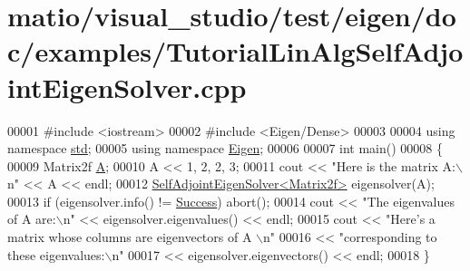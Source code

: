 \hypertarget{matio_2visual__studio_2test_2eigen_2doc_2examples_2_tutorial_lin_alg_self_adjoint_eigen_solver_8cpp_source}{}\section{matio/visual\+\_\+studio/test/eigen/doc/examples/\+Tutorial\+Lin\+Alg\+Self\+Adjoint\+Eigen\+Solver.cpp}
\label{matio_2visual__studio_2test_2eigen_2doc_2examples_2_tutorial_lin_alg_self_adjoint_eigen_solver_8cpp_source}

\begin{DoxyCode}
00001 \textcolor{preprocessor}{#include <iostream>}
00002 \textcolor{preprocessor}{#include <Eigen/Dense>}
00003 
00004 \textcolor{keyword}{using namespace }\hyperlink{namespacestd}{std};
00005 \textcolor{keyword}{using namespace }\hyperlink{namespace_eigen}{Eigen};
00006 
00007 \textcolor{keywordtype}{int} main()
00008 \{
00009    Matrix2f \hyperlink{group___core___module_class_eigen_1_1_matrix}{A};
00010    A << 1, 2, 2, 3;
00011    cout << \textcolor{stringliteral}{"Here is the matrix A:\(\backslash\)n"} << A << endl;
00012    \hyperlink{group___eigenvalues___module_class_eigen_1_1_self_adjoint_eigen_solver}{SelfAdjointEigenSolver<Matrix2f>} eigensolver(A);
00013    \textcolor{keywordflow}{if} (eigensolver.info() != \hyperlink{group__enums_gga85fad7b87587764e5cf6b513a9e0ee5ea52581b035f4b59c203b8ff999ef5fcea}{Success}) abort();
00014    cout << \textcolor{stringliteral}{"The eigenvalues of A are:\(\backslash\)n"} << eigensolver.eigenvalues() << endl;
00015    cout << \textcolor{stringliteral}{"Here's a matrix whose columns are eigenvectors of A \(\backslash\)n"}
00016         << \textcolor{stringliteral}{"corresponding to these eigenvalues:\(\backslash\)n"}
00017         << eigensolver.eigenvectors() << endl;
00018 \}
\end{DoxyCode}
